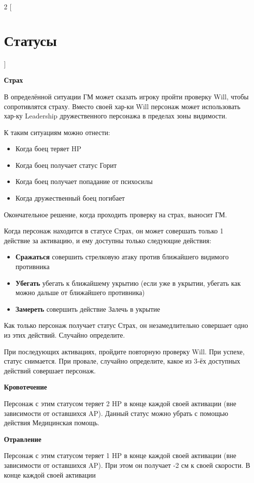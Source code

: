 \begin{multicols}{2}
    [
    \section{Статусы}
    ]    

    \textbf{Страх}

    В определённой ситуации ГМ может сказать игроку пройти проверку Will, чтобы сопротивлятся страху. Вместо своей хар-ки Will персонаж может использовать хар-ку Leadership 
    дружественного персонажа в пределах зоны видимости.

    К таким ситуациям можно отнести:

    \begin{itemize}
        \item Когда боец теряет HP
        \item Когда боец получает статус Горит
        \item Когда боец получает попадание от психосилы
        \item Когда дружественный боец погибает
    \end{itemize}

    Окончательное решение, когда проходить проверку на страх, выносит ГМ.

    Когда персонаж находится в статусе Страх, он может совершать только 1 действие за активацию, и ему доступны только следующие действия:

    \begin{itemize}
        \item \textbf{Сражаться} совершить стрелковую атаку против ближайшего видимого противника
        \item \textbf{Убегать} убегать к ближайшему укрытию (если уже в укрытии, убегать как можно дальше от ближайшего противника)
        \item \textbf{Замереть} совершить действие Залечь в укрытие
    \end{itemize}

    Как только персонаж получает статус Страх, он незамедлительно совершает одно из этих действий. Случайно определите.

    При последующих активациях, пройдите повторную проверку Will. При успехе, статус снимается. При провале, случайно определите, какое из 3-ёх доступных действий совершает персонаж.

    \textbf{Кровотечение}

    Персонаж с этим статусом теряет 2 HP в конце каждой своей активации (вне зависимости от оставшихся AP). Данный статус можно убрать с помощью действия Медицинская помощь.

    \textbf{Отравление}

    Персонаж с этим статусом теряет 1 HP в конце каждой своей активации (вне зависимости от оставшихся AP). При этом он получает -2 см к своей скорости. В конце каждой своей активации
\end{multicols}